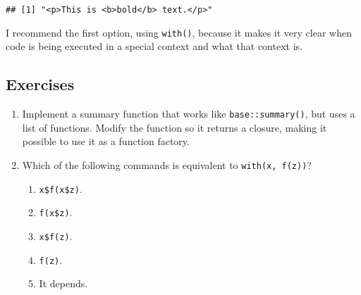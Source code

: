 \begin{itemize}
\begin{Shaded}
\begin{Highlighting}[]
\NormalTok{(}\NormalTok{, }\NormalTok{(}\NormalTok{), }\NormalTok{)}
\end{Highlighting}
\end{Shaded}

\begin{verbatim}
## [1] "<p>This is <b>bold</b> text.</p>"
\end{verbatim}

\begin{Shaded}
\begin{Highlighting}[]
\NormalTok{(}  \NormalTok{())}
\end{Highlighting}
\end{Shaded}
\end{itemize}

I recommend the first option, using \texttt{with()}, because it makes it
very clear when code is being executed in a special context and what
that context is.

\hypertarget{exercises-2}{%
\subsection{Exercises}\label{exercises-2}}

\begin{enumerate}
\def\labelenumi{\arabic{enumi}.}
\item
  Implement a summary function that works like \texttt{base::summary()},
  but uses a list of functions. Modify the function so it returns a
  closure, making it possible to use it as a function factory.
\item
  Which of the following commands is equivalent to
  \texttt{with(x,\ f(z))}?

  \begin{enumerate}
  \def\labelenumii{(\alph{enumii})}
  \tightlist
  \item
    \texttt{x\$f(x\$z)}.
  \item
    \texttt{f(x\$z)}.
  \item
    \texttt{x\$f(z)}.
  \item
    \texttt{f(z)}.
  \item
    It depends.
  \end{enumerate}
\end{enumerate}

